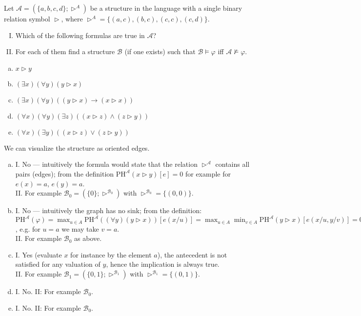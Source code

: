 \begin{problem}

    Let $\mathcal{A}=(\{a,b,c,d\};\vartriangleright^{A})$ be a structure in the language with a single binary relation symbol $\vartriangleright$, where $\vartriangleright^{A}=\{(a,c), (b,c), (c,c), (c,d)\}$. 
    \begin{enumerate}[I.]
        \item Which of the following formulas are true in $\mathcal A$? 
        \item For each of them find a structure $\mathcal{B}$ (if one exists) such that $\mathcal{B}\models \varphi$ iff $\mathcal{A}\not\models \varphi$.
    \end{enumerate}    
    \begin{enumerate}[(a)]
       \item $x \vartriangleright y$
       \item $(\exists x)(\forall y)(y \vartriangleright x)$
       \item $(\exists x)(\forall y)((y \vartriangleright x) \to (x \vartriangleright x))$
       \item $(\forall x)(\forall y)(\exists z)((x \vartriangleright z)\wedge(z \vartriangleright y))$
       \item $(\forall x)(\exists y)((x \vartriangleright z)\vee(z \vartriangleright y))$
    \end{enumerate}

    \begin{solution}

        We can visualize the structure as oriented edges.
        \begin{enumerate}[(a)]
            \item I. No — intuitively the formula would state that the relation $\vartriangleright^\mathcal A$ contains all pairs (edges); from the definition $\mathrm{PH}^\mathcal A(x \vartriangleright y)[e]=0$ for example for $e(x)=a$, $e(y)=a$.\\            
            II. For example $\mathcal B_0=(\{0\};\vartriangleright^{\mathcal B_0})$ with $\vartriangleright^{\mathcal B_0}=\{(0,0)\}$.
            \item I. No — intuitively the graph has no sink; from the definition: $\mathrm{PH}^\mathcal A(\varphi)=\max_{u\in A}\mathrm{PH}^\mathcal A((\forall y)(y \vartriangleright x))[e(x/u)]=\max_{u\in A}\min_{v\in A}\mathrm{PH}^\mathcal A(y \vartriangleright x)[e(x/u,y/v)]=0$, e.g. for $u=a$ we may take $v=a$.\\
            II. For example $\mathcal B_0$ as above.
            \item I. Yes (evaluate $x$ for instance by the element $a$), the antecedent is not satisfied for any valuation of $y$, hence the implication is always true.\\
            II. For example $\mathcal B_1=(\{0,1\};\vartriangleright^{\mathcal B_1})$ with $\vartriangleright^{\mathcal B_1}=\{(0,1)\}$.
            \item I. No. II: For example $\mathcal B_0$.
            \item I. No. II: For example $\mathcal B_0$.  
        \end{enumerate}
        

\end{solution}
\end{problem}
